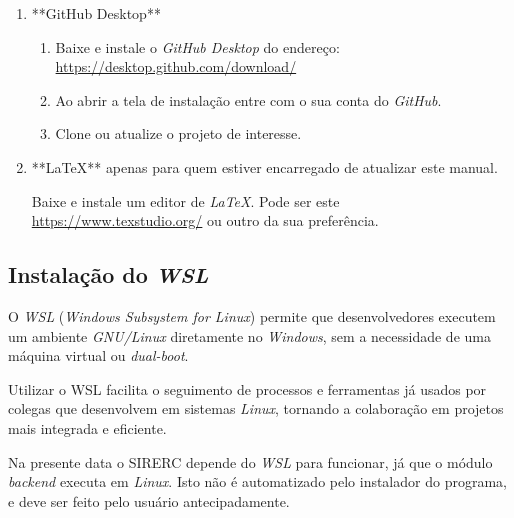 \documentclass[a4paper,11pt]{article}
\newcommand{\sistema}{\textsf{SIRERC}}
\newcommand{\windows}{\textit{Windows}}
\newcommand{\linux}{\textit{Linux}}
\newcommand{\github}{\textit{GitHub}}
\begin{document}
\begin{enumerate}
	
	\item **GitHub Desktop**
	\begin{enumerate}
		\item Baixe e instale o \textit{GitHub Desktop} do endereço: \url{https://desktop.github.com/download/}
		\item Ao abrir a tela de instalação entre com o sua conta do \github{}.
		\item Clone ou atualize o projeto de interesse.
	\end{enumerate}

	\item **LaTeX** {\color{blue}apenas para quem estiver encarregado de atualizar este manual.}

		Baixe e instale um editor de \textit{LaTeX}. Pode ser este \url{https://www.texstudio.org/} ou outro da sua preferência.

\end{enumerate}


\subsection{Instalação do \emph{WSL}}

O \textit{WSL} (\textit{Windows Subsystem for Linux}) permite que desenvolvedores executem um ambiente \textit{GNU/Linux} diretamente no \windows{}, sem a necessidade de uma máquina virtual ou \textit{dual-boot}.

Utilizar o WSL facilita o seguimento de processos e ferramentas já usados por colegas que desenvolvem em sistemas \textit{Linux}, tornando a colaboração em projetos mais integrada e eficiente.

Na presente data o \sistema{} depende do \emph{WSL} para funcionar, já que o módulo \textit{backend} executa em \linux{}. Isto não é automatizado pelo instalador do programa, e deve ser feito pelo usuário antecipadamente.
\end{document}
